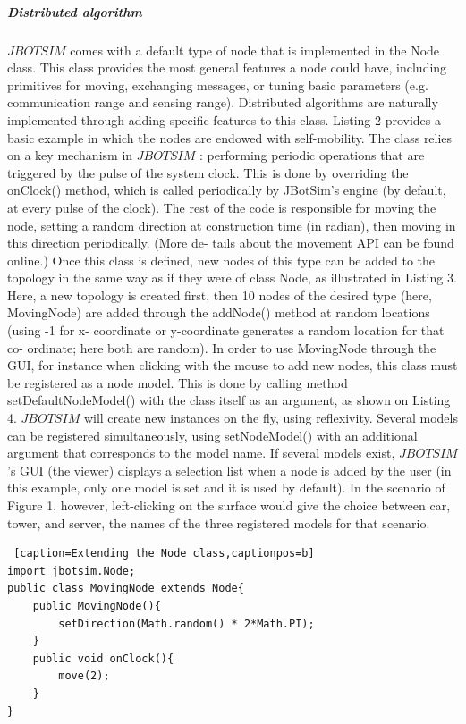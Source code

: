 \subparagraph{Distributed algorithm} $JBOTSIM$  comes with a default type of node that is implemented in the Node class. This class provides the most general features a node could have, including primitives for moving, exchanging messages, or tuning basic parameters (e.g. communication range and sensing range). Distributed algorithms are naturally implemented through adding specific features to this class. Listing 2 provides a basic example in which the nodes are endowed with self-mobility. The class relies on a key mechanism in  $JBOTSIM$ : performing periodic operations that are triggered by the pulse of the system clock. This is done by overriding the onClock() method, which is called periodically by JBotSim’s engine (by default, at every pulse of the clock). The rest of the code is responsible for moving the node, setting a random direction at construction time (in radian), then moving in this direction periodically. (More de- tails about the movement API can be found online.) Once this class is defined, new nodes of this type can be added to the topology in the same way as if they were of class Node, as illustrated in Listing 3. Here, a new topology is created first, then 10 nodes of the desired type (here, MovingNode) are added through the addNode() method at random locations (using -1 for x- coordinate or y-coordinate generates a random location for that co- ordinate; here both are random). In order to use MovingNode through the GUI, for instance when clicking with the mouse to add new nodes, this class must be registered as a node model. This is done by calling method setDefaultNodeModel() with the class itself as an argument, as shown on Listing 4. $JBOTSIM$ will create new instances on the fly, using reflexivity. Several models can be registered simultaneously, using setNodeModel() with an additional argument that corresponds to the model name. If several models exist,  $JBOTSIM$ ’s GUI (the viewer) displays a selection list when a node is added by the user (in this example, only one model is set and it is used by default). In the scenario of Figure 1, however, left-clicking on the surface would give the choice between car, tower, and server, the names of the three registered models for that scenario.
\begin{lstlisting} [caption=Extending the Node class,captionpos=b]
import jbotsim.Node;
public class MovingNode extends Node{
	public MovingNode(){
		setDirection(Math.random() * 2*Math.PI);
	}
	public void onClock(){
		move(2);
	}
}
\end{lstlisting}

